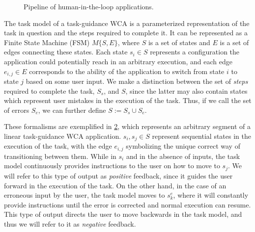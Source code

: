 \begin{figure}[b]
    \centering
    
    \caption{Pipeline of human-in-the-loop applications.}\label{paper:olguinmunoz2019edgedroid:fig:pipeline2}
\end{figure}

The task model of a task-guidance \gls{WCA} is a parameterized representation of the task in question and the steps required to complete it.
It can be represented as a Finite State Machine (FSM) \( M\{S, E\} \), where \(S\) is a set of states and \(E\) is a set of edges connecting these states.
Each state \(s_i \in S\) represents a configuration the application could potentially reach in an arbitrary execution, and each edge \(e_{i,j} \in E\) corresponds to the ability of the application to switch from state \(i\) to state \(j\) based on some user input.
We make a distinction between the set of \emph{steps} required to complete the task, \(S_s\), and \(S\), since the latter may also contain states which represent user mistakes in the execution of the task.
Thus, if we call the set of errors \(S_e\), we can further define \(S := S_s \cup S_e\).

\begin{figure}[tb]
    \centering
    
    \label{paper:olguinmunoz2019edgedroid:fig:taskmodel}
\end{figure}

These formalisms are exemplified in \cref{paper:olguinmunoz2019edgedroid:fig:taskmodel}, which represents an arbitrary segment of a linear task-guidance \gls{WCA} application.
\(s_{i}, s_{j} \in S\) represent sequential states in the execution of the task, with the edge \(e_{i,j}\) symbolizing the unique correct way of transitioning between them.
While in \(s_i\) and in the absence of inputs, the task model continuously provides instructions to the user on how to move to \(s_j\).
We will refer to this type of output as \emph{positive} feedback, since it guides the user forward in the execution of the task.
On the other hand, in the case of an erroneous input by the user, the task model moves to \(s^{e}_{k}\), where it will constantly provide instructions until the error is corrected and normal execution can resume.
This type of output directs the user to move backwards in the task model, and thus we will refer to it as \emph{negative} feedback.

